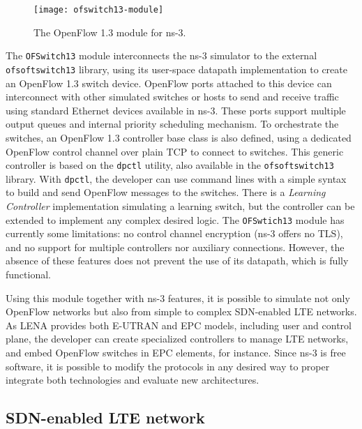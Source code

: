 \begin{figure}[htb]
  \centering
  \texttt{[image: ofswitch13-module]}
  \caption{The OpenFlow 1.3 module for \acs{ns-3}.}
  \label{fig:ofswitch13-module}
\end{figure}

The \texttt{OFSwitch13} module interconnects the \ac{ns-3} simulator to the
external \texttt{ofsoftswitch13} library, using its user-space datapath
implementation to create an OpenFlow 1.3 switch device. OpenFlow ports attached
to this device can interconnect with other simulated switches or hosts to send
and receive traffic using standard Ethernet devices available in \ac{ns-3}.
These ports support multiple output queues and internal priority scheduling
mechanism. To orchestrate the switches, an OpenFlow 1.3 controller base class
is also defined, using a dedicated OpenFlow control channel over plain \ac{TCP}
to connect to switches. This generic controller is based on the \texttt{dpctl}
utility, also available in the \texttt{ofsoftswitch13} library. With
\texttt{dpctl}, the developer can use command lines with a simple syntax to
build and send OpenFlow messages to the switches. There is a \emph{Learning
Controller} implementation simulating a learning switch, but the controller can
be extended to implement any complex desired logic. The \texttt{OFSwtich13}
module has currently some limitations: no control channel encryption (\ac{ns-3}
offers no \ac{TLS}), and no support for multiple controllers nor auxiliary
connections. However, the absence of these features does not prevent the use of
its datapath, which is fully functional.

Using this module together with \ac{ns-3} features, it is possible to simulate
not only OpenFlow networks but also from simple to complex \ac{SDN}-enabled
\ac{LTE} networks. As \ac{LENA} provides both \ac{E-UTRAN} and \ac{EPC} models,
including user and control plane, the developer can create specialized
controllers to manage \ac{LTE} networks, and embed OpenFlow switches in
\ac{EPC} elements, for instance. Since \ac{ns-3} is free software, it is
possible to modify the protocols in any desired way to proper integrate both
technologies and evaluate new architectures.


\subsection{\acs{SDN}-enabled \acs{LTE} network}
\label{sec:scenario}

